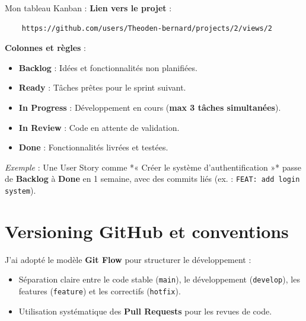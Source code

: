 \begin{for_you}{Mon tableau Kanban :}
    \textbf{Lien vers le projet} :
    \begin{verbatim}
    https://github.com/users/Theoden-bernard/projects/2/views/2
    \end{verbatim}

    \textbf{Colonnes et règles} :
    \begin{itemize}
        \item \textbf{Backlog} : Idées et fonctionnalités non planifiées.
        \item \textbf{Ready} : Tâches prêtes pour le sprint suivant.
        \item \textbf{In Progress} : Développement en cours (\textbf{max 3 tâches simultanées}).
        \item \textbf{In Review} : Code en attente de validation.
        \item \textbf{Done} : Fonctionnalités livrées et testées.
        \newline
    \end{itemize}

    \textit{Exemple} :
    Une User Story comme *« Créer le système d’authentification »* passe de \textbf{Backlog} à \textbf{Done} en 1 semaine, avec des commits liés (ex. : \texttt{FEAT: add login system}).
\end{for_you}

\newpage

\section{Versioning GitHub et conventions}

J’ai adopté le modèle \textbf{Git Flow} pour structurer le développement :
\begin{itemize}
    \item Séparation claire entre le code stable (\texttt{main}), le développement (\texttt{develop}), les features (\texttt{feature}) et les correctifs (\texttt{hotfix}).
    \item Utilisation systématique des \textbf{Pull Requests} pour les revues de code.
    \newline
\end{itemize}


